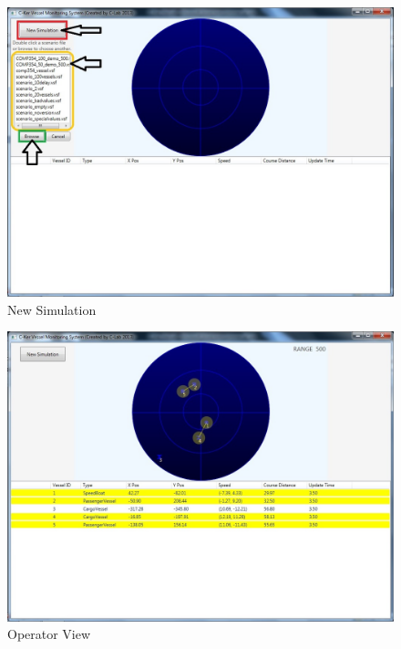 \documentclass[12pt]{article}
\begin{document}
\begin{enumerate} [(a)]
\begin{figure}[h!]
    \centering
    \includegraphics[scale=1]{manu2}
    \caption{New Simulation}
    \label{fig:New Simulation}
\end{figure}\par
\clearpage
\begin{figure}[h!]
    \centering
    \includegraphics[scale=1]{manu3}
    \caption{Operator View}
    \label{fig:Operator View}
\end{figure}\par




\end{enumerate}
\end{document}
